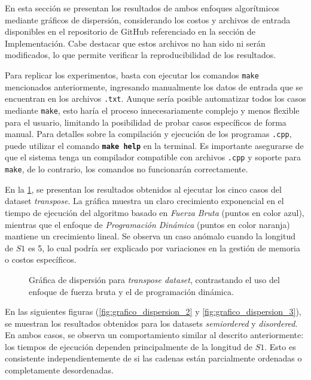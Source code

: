 En esta sección se presentan los resultados de ambos enfoques algorítmicos mediante gráficos de dispersión, considerando los costos y archivos de entrada disponibles en el repositorio de GitHub referenciado en la sección de Implementación. Cabe destacar que estos archivos no han sido ni serán modificados, lo que permite verificar la reproducibilidad de los resultados.

Para replicar los experimentos, basta con ejecutar los comandos \texttt{make} mencionados anteriormente, ingresando manualmente los datos de entrada que se encuentran en los archivos \texttt{.txt}. Aunque sería posible automatizar todos los casos mediante \texttt{make}, esto haría el proceso innecesariamente complejo y menos flexible para el usuario, limitando la posibilidad de probar casos específicos de forma manual. Para detalles sobre la compilación y ejecución de los programas \texttt{.cpp}, puede utilizar el comando \textbf{\texttt{make help}} en la terminal. Es importante asegurarse de que el sistema tenga un compilador compatible con archivos \texttt{.cpp} y soporte para \texttt{make}, de lo contrario, los comandos no funcionarán correctamente.

En la \cref{fig:grafico_dispersion_1}, se presentan los resultados obtenidos al ejecutar los cinco casos del dataset \textit{transpose}. La gráfica muestra un claro crecimiento exponencial en el tiempo de ejecución del algoritmo basado en \textit{Fuerza Bruta} (puntos en color azul), mientras que el enfoque de \textit{Programación Dinámica} (puntos en color naranja) mantiene un crecimiento lineal. Se observa un caso anómalo cuando la longitud de \( S1 \) es 5, lo cual podría ser explicado por variaciones en la gestión de memoria o costos específicos.

\begin{figure}[H]
    \centering
    
    \caption{Gráfica de dispersión para \textit{transpose dataset}, contrastando el uso del enfoque de fuerza bruta y el de programación dinámica.}
    \label{fig:grafico_dispersion_1}
\end{figure}

En las siguientes figuras (\cref{fig:grafico_dispersion_2} y \cref{fig:grafico_dispersion_3}), se muestran los resultados obtenidos para los datasets \textit{semiordered} y \textit{disordered}. En ambos casos, se observa un comportamiento similar al descrito anteriormente: los tiempos de ejecución dependen principalmente de la longitud de \( S1 \). Esto es consistente independientemente de si las cadenas están parcialmente ordenadas o completamente desordenadas. 

